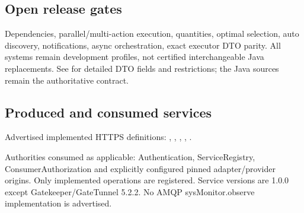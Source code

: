 \documentclass[a4paper]{arrowhead}
\begin{document}
\subsection{Open release gates}
Dependencies, parallel/multi-action execution, quantities, optimal selection, auto discovery, notifications, async orchestration, exact executor DTO parity. All systems remain development profiles, not certified interchangeable Java replacements. See  for detailed DTO fields and restrictions; the Java sources remain the authoritative contract.
\subsection{Produced and consumed services}
Advertised implemented HTTPS definitions: , \allowbreak {}, \allowbreak {}, \allowbreak {}, \allowbreak {}.\par
Authorities consumed as applicable: Authentication, ServiceRegistry, ConsumerAuthorization and explicitly configured pinned adapter/provider origins. Only implemented operations are registered. Service versions are 1.0.0 except Gatekeeper/GateTunnel 5.2.2. No AMQP sysMonitor.observe implementation is advertised.
\end{document}
